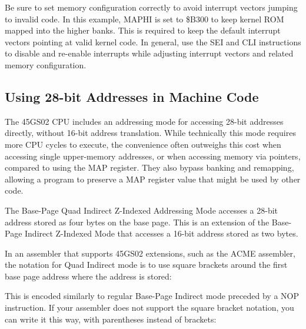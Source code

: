 Be sure to set memory configuration correctly to avoid interrupt vectors jumping to
invalid code. In this example, MAPHI is set to \$B300 to keep kernel ROM mapped
into the higher banks. This is required to keep the default interrupt vectors
pointing at valid kernel code. In general, use the SEI and CLI instructions to
disable and re-enable interrupts while adjusting interrupt vectors and related
memory configuration.

\subsection{Using 28-bit Addresses in Machine Code}

The 45GS02 CPU includes an addressing mode for accessing 28-bit addresses
directly, without 16-bit address translation. While technically this mode
requires more CPU cycles to execute, the convenience often outweighs this cost
when accessing single upper-memory addresses, or when accessing memory via
pointers, compared to using the MAP register. They also bypass banking and
remapping, allowing a program to preserve a MAP register value that might be
used by other code.

The Base-Page Quad Indirect Z-Indexed Addressing Mode accesses a 28-bit address
stored as four bytes on the base page. This is an extension of the Base-Page
Indirect Z-Indexed Mode that accesses a 16-bit address stored as two bytes.

In an assembler that supports 45GS02 extensions, such as the ACME assembler, the
notation for Quad Indirect mode is to use square brackets around the first base
page address where the address is stored:


This is encoded similarly to regular Base-Page Indirect mode preceded by a NOP
instruction. If your assembler does not support the square bracket notation,
you can write it this way, with parentheses instead of brackets:

